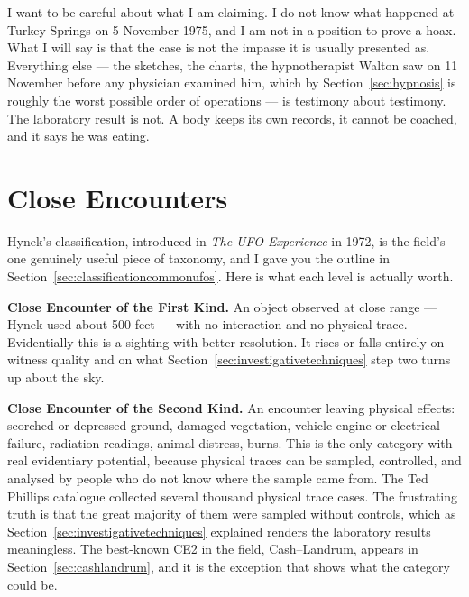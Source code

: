 I want to be careful about what I am claiming. I do not know what happened at Turkey Springs on
5 November 1975, and I am not in a position to prove a hoax. What I will say is that the case is
not the impasse it is usually presented as.  Everything else --- the sketches, the charts, the
hypnotherapist Walton saw on 11 November before any physician examined him, which by
Section~\ref{sec:hypnosis} is roughly the worst possible order of operations --- is testimony
about testimony. The laboratory result is not. A body keeps its own records, it cannot be
coached, and it says he was eating.

\section{Close Encounters}\label{sec:closeencounters}

Hynek's classification, introduced in \emph{The UFO Experience} in 1972, is the field's one
genuinely useful piece of taxonomy, and I gave you the outline in Section~\ref{sec:classificationcommonufos}. Here is what
each level is actually worth.

\textbf{Close Encounter of the First Kind.} An object observed at close range --- Hynek used
about 500 feet --- with no interaction and no physical trace. Evidentially this is a
sighting with better resolution. It rises or falls entirely on witness quality and on what
Section~\ref{sec:investigativetechniques} step two turns up about the sky.

\textbf{Close Encounter of the Second Kind.} An encounter leaving physical effects: scorched
or depressed ground, damaged vegetation, vehicle engine or electrical failure, radiation
readings, animal distress, burns. This is the only category with real evidentiary potential,
because physical traces can be sampled, controlled, and analysed by people who do not know
where the sample came from. The Ted Phillips catalogue collected several thousand physical
trace cases. The frustrating truth is that the great majority of them were sampled without
controls, which as Section~\ref{sec:investigativetechniques} explained renders the laboratory results meaningless. The
best-known CE2 in the field, Cash--Landrum, appears in Section~\ref{sec:cashlandrum}, and it
is the exception that shows what the category could be.

